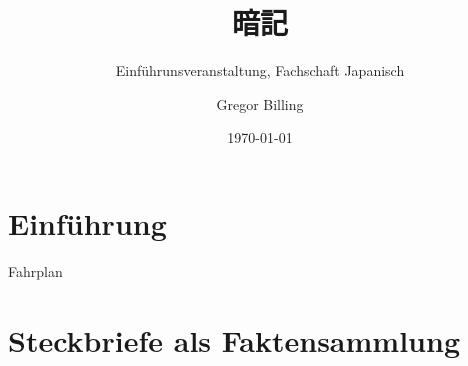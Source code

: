 \documentclass[aspectratio=169,compress]{beamer}
\title{暗記}
\subtitle{Einführunsveranstaltung, Fachschaft Japanisch}
\author[G. Billing]{Gregor Billing}
\institute[UzK]{Universität zu Köln}
\date[\today]{\today}
\begin{document}


\begin{frame}
	\titlepage
\end{frame}

\section*{Einführung}

\begin{frame}{Fahrplan}
	\tableofcontents
\end{frame}

\section{Steckbriefe als Faktensammlung}
\end{document}
